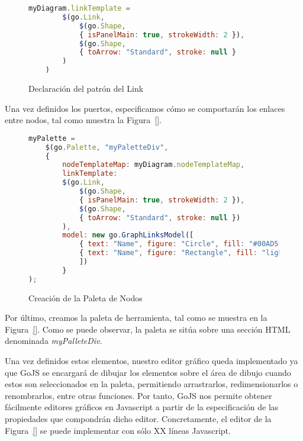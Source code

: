 
\begin{figure}[!tb]
	\centering
	\begin{lstlisting}[language=JavaScript]
	myDiagram.linkTemplate =
		$(go.Link, 
			$(go.Shape,  
			{ isPanelMain: true, strokeWidth: 2 }),
			$(go.Shape,  
			{ toArrow: "Standard", stroke: null }
		)
	)
	\end{lstlisting}
\caption{Declaración del patrón del Link}
\label{fig:patronlink}
\end{figure}

Una vez definidos los puertos, especificamos cómo se comportarán los enlaces entre nodos, tal como muestra la Figura~\ref{}. %


\begin{figure}[!tb]
	\centering
\begin{lstlisting}[language=JavaScript]
myPalette =
	$(go.Palette, "myPaletteDiv",  
	{
		nodeTemplateMap: myDiagram.nodeTemplateMap,  
		linkTemplate: 
		$(go.Link,
			$(go.Shape, 
			{ isPanelMain: true, strokeWidth: 2 }),
			$(go.Shape,  
			{ toArrow: "Standard", stroke: null })
		),
		model: new go.GraphLinksModel([  
			{ text: "Name", figure: "Circle", fill: "#00AD5F" },
			{ text: "Name", figure: "Rectangle", fill: "lightgray" }
			])
		}
);
\end{lstlisting}
\caption{Creación de la Paleta de Nodos}
\label{fig:paletaNodos}
\end{figure}

Por último, creamos la paleta de herramienta, tal como se muestra en la Figura~\ref{}. Como se puede observar, la paleta se sitúa sobre una sección HTML denominada \emph{myPalleteDiv}. 


Una vez definidos estos elementos, nuestro editor gráfico queda implementado ya que GoJS se encargará de dibujar los elementos sobre el área de dibujo cuando estos son seleccionados en la paleta, permitiendo arrastrarlos, redimensionarlos o renombrarlos, entre otras funciones. Por tanto, GoJS nos permite obtener fácilmente editores gráficos en Javascript a partir de la especificación
de las propiedades que compondrán dicho editor. Concretamente, el editor de la Figura~\ref{} se puede implementar con sólo XX líneas Javascript.     